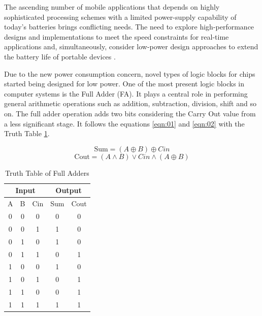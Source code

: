 \documentclass[ecp,tc, english]{iiufrgs}
\newcommand*\xor{\mathbin{\oplus}}
\begin{document}
The ascending number of mobile applications that depends on highly sophisticated processing schemes with a limited power-supply capability of today’s batteries brings conflicting needs. The need to explore high-performance designs and implementations to meet the speed constraints for real-time applications and, simultaneously, consider low-power design approaches to extend the battery life of portable devices \cite{shoarinejad:03}. 

Due to the new power consumption concern, novel types of logic blocks for chips started being designed for low power. One of the most present logic blocks in computer systems is the Full Adder (FA). It plays a central role in performing general arithmetic operations such as addition, subtraction, division, shift and so on. The full adder operation adds two bits considering the Carry Out value from a less significant stage. It follows the equations \ref{eqn:01} and \ref{eqn:02} with the Truth Table \ref{tab:01}.

\begin{equation}
\label{eqn:01}
\text{Sum} = (A \xor{} B) \xor{} Cin
\end{equation}
\begin{equation}
\label{eqn:02}
\text{Cout} = (A \wedge B) \vee Cin \wedge (A \xor{} B)
\end{equation}

\begin{table}[H]
\centering
\caption{Truth Table of Full Adders}
\label{tab:01}
\begin{tabular}{ccccc}
\hline
\multicolumn{3}{c}{Input} & \multicolumn{2}{c}{Output} \\ \hline
A       & B      & Cin      & Sum          & Cout         \\ \hline
0       & 0      & 0        & 0            & 0            \\ \hline
0       & 0      & 1        & 1            & 0            \\ \hline
0       & 1      & 0        & 1            & 0            \\ \hline
0       & 1      & 1        & 0            & 1            \\ \hline
1       & 0      & 0        & 1            & 0            \\ \hline
1       & 0      & 1        & 0            & 1            \\ \hline
1       & 1      & 0        & 0            & 1            \\ \hline
1       & 1      & 1        & 1            & 1            \\ \hline
\end{tabular}
\end{table}
\end{document}

